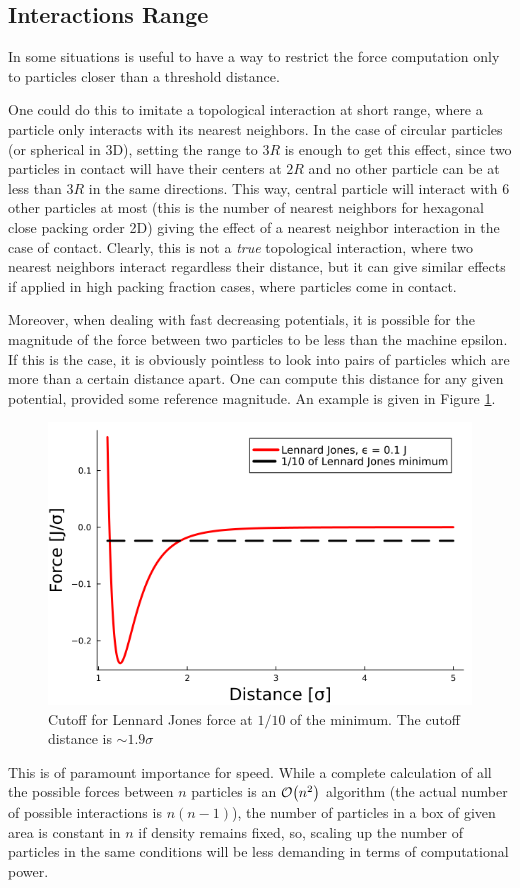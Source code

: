 \documentclass[../../master_thesis_np.tex]{subfiles}
\begin{document}
	
	\subsection{Interactions Range} \label{intrange}
	In some situations is useful to have a way to restrict the force computation only to particles closer than a threshold distance.
	
	One could do this to imitate a topological interaction at short range, where a particle only interacts with its nearest neighbors. In the case of circular particles (or spherical in 3D), setting the range to $3R$ is enough to get this effect, since two particles in contact will have their centers at $2R$ and no other particle can be at less than $3R$ in the same directions. This way, central particle will interact with 6 other particles at most (this is the number of nearest neighbors for hexagonal close packing order 2D) giving the effect of a nearest neighbor interaction in the case of contact. Clearly, this is not a \emph{true} topological interaction, where two nearest neighbors interact regardless their distance, but it can give similar effects if applied in high packing fraction cases, where particles come in contact.
	
	Moreover, when dealing with fast decreasing potentials, it is possible for the magnitude of the force between two particles to be less than the machine epsilon. If this is the case, it is obviously pointless to look into pairs of particles which are more than a certain distance apart. One can compute this distance for any given potential, provided some reference magnitude. An example is given in Figure \ref{fig:force_zero}.
	\begin{figure}[htp]
		\centering
		\includegraphics[width=\textwidth]{lj_zero.png}
		\caption{Cutoff for Lennard Jones force at $1/10$ of the minimum. The cutoff distance is $\sim 1.9\sigma$}
		\label{fig:force_zero}
	\end{figure}
	This is of paramount importance for speed. While a complete calculation of all the possible forces between $n$ particles is an $\order{n^2}$ algorithm (the actual number of possible interactions is $n(n-1)$), the number of particles in a box of given area is constant in $n$ if density remains fixed, so, scaling up the number of particles in the same conditions will be less demanding in terms of computational power.
	
\end{document}
